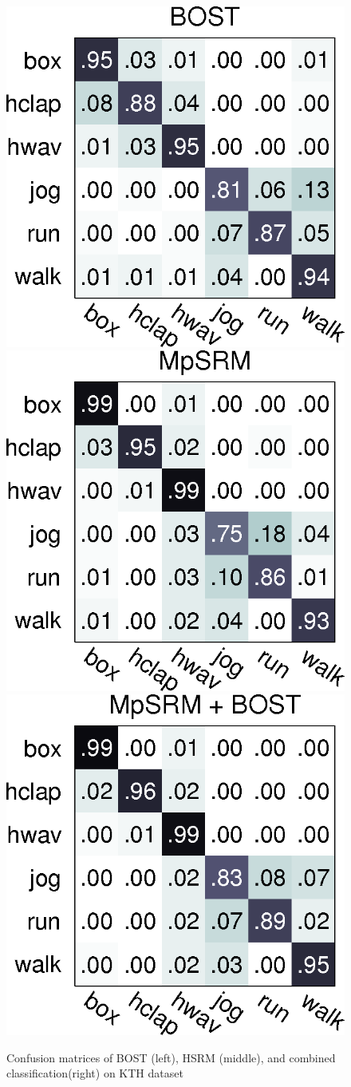 \begin{figure}[ht]
\centering
\includegraphics[width=0.32\linewidth]{fig/act/bost.png}
\includegraphics[width=0.32\linewidth]{fig/act/mpsrm.png}
\includegraphics[width=0.32\linewidth]{fig/act/combine.png}
\caption{Confusion matrices of BOST (left), HSRM (middle), and combined classification(right) on KTH dataset}
\label{fig/act/confusion}
\end{figure}



